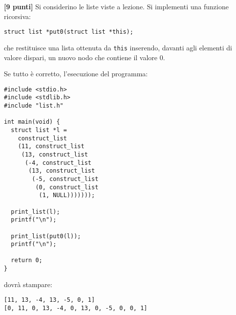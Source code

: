 \documentclass{article}[10pt]
\newcounter{esnu}
\newenvironment{esercizio}{\medskip \noindent {\bf Esercizio\addtocounter{esnu}{1} \arabic{esnu}}}{}
\begin{document}
\begin{esercizio}
\textbf{[9 punti]}
Si considerino le liste viste a lezione. Si implementi una funzione ricorsiva:
\begin{verbatim}
struct list *put0(struct list *this);
\end{verbatim}
che restituisce una lista ottenuta da \texttt{this} inserendo, davanti agli elementi di valore dispari, un nuovo nodo che contiene
il valore $0$.

Se tutto \`e corretto, l'esecuzione del programma:

{\small
\begin{verbatim}
#include <stdio.h>
#include <stdlib.h>
#include "list.h"

int main(void) {
  struct list *l =
    construct_list
    (11, construct_list
     (13, construct_list
      (-4, construct_list
       (13, construct_list
        (-5, construct_list
         (0, construct_list
          (1, NULL)))))));

  print_list(l);
  printf("\n");

  print_list(put0(l));
  printf("\n");

  return 0;
}
\end{verbatim}
}
\noindent
dovr\`a stampare:

{\small
\begin{verbatim}
[11, 13, -4, 13, -5, 0, 1]
[0, 11, 0, 13, -4, 0, 13, 0, -5, 0, 0, 1]
\end{verbatim}
}
%
\end{esercizio}
%
\end{document}
